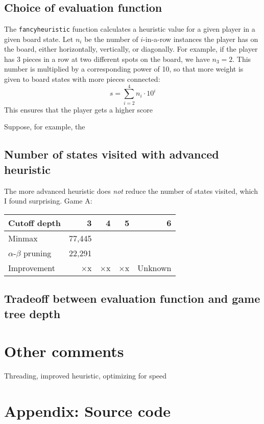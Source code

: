 \documentclass[letterpaper, 11pt]{article}
\numberwithin{theorem}{section}
\begin{document}
\section{}
\subsection{Choice of evaluation function}
The \texttt{fancyheuristic} function calculates a heuristic value for a given player in a given board state. Let $n_i$ be the number of $i$-in-a-row instances the player has on the board, either horizontally, vertically, or diagonally. For example, if the player has 3 pieces in a row at two different spots on the board, we have $n_3 = 2$. This number is multiplied by a corresponding power of 10, so that more weight is given to board states with more pieces connected:
\[ s = \sum_{i=2}^4 n_i \cdot 10^i \]
This ensures that the player gets a higher score 

Suppose, for example, the 

\subsection{Number of states visited with advanced heuristic}
The more advanced heuristic does \emph{not} reduce the number of states visited, which I found surprising.
Game A:
\begin{table}[h]
	\centering
	\small
	\begin{tabular}{lrrrr}
		Cutoff depth & 3 & 4 & 5 & 6 \\
		\midrule
		Minmax & 77,445 &&& \\
		$\alpha$-$\beta$ pruning & 22,291 &&&\\
		\midrule
		Improvement & $\times$x & $\times$x & $\times$x & Unknown
	\end{tabular}
\end{table}

\subsection{Tradeoff between evaluation function and game tree depth}

\section*{Other comments}
Threading, improved heuristic, optimizing for speed

\clearpage
\appendix
\section{Appendix: Source code}
\end{document}
